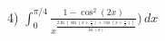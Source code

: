\documentclass{article}
\begin{document}
4) ${\displaystyle \int_{0}^{\pi/4} \frac{1-\cos^2(2x)}{x^{\frac{2\ln(\sin(x+\frac{\pi}{4})+\cos(x+\frac{\pi}{4}))}{\ln(x)}}}) \,dx}$ \newline
\end{document}
